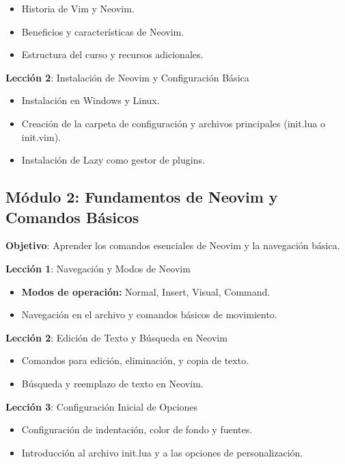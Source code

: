\documentclass[
  a4paper,
  DIV=11,
  numbers=noendperiod,
  onepage,
  openany]{scrreprt}
\begin{document}
\begin{itemize}
\item
  Historia de Vim y Neovim.
\item
  Beneficios y características de Neovim.
\item
  Estructura del curso y recursos adicionales.
\end{itemize}

\textbf{Lección 2}: Instalación de Neovim y Configuración Básica

\begin{itemize}
\item
  Instalación en Windows y Linux.
\item
  Creación de la carpeta de configuración y archivos principales
  (init.lua o init.vim).
\item
  Instalación de Lazy como gestor de plugins.
\end{itemize}

\subsection{\texorpdfstring{\textbf{Módulo 2}: Fundamentos de Neovim y
Comandos
Básicos}{Módulo 2: Fundamentos de Neovim y Comandos Básicos}}\label{muxf3dulo-2-fundamentos-de-neovim-y-comandos-buxe1sicos}

\textbf{Objetivo}: Aprender los comandos esenciales de Neovim y la
navegación básica.

\textbf{Lección 1}: Navegación y Modos de Neovim

\begin{itemize}
\item
  \textbf{Modos de operación:} Normal, Insert, Visual, Command.
\item
  Navegación en el archivo y comandos básicos de movimiento.
\end{itemize}

\textbf{Lección 2}: Edición de Texto y Búsqueda en Neovim

\begin{itemize}
\item
  Comandos para edición, eliminación, y copia de texto.
\item
  Búsqueda y reemplazo de texto en Neovim.
\end{itemize}

\textbf{Lección 3}: Configuración Inicial de Opciones

\begin{itemize}
\item
  Configuración de indentación, color de fondo y fuentes.
\item
  Introducción al archivo init.lua y a las opciones de personalización.
\end{itemize}
\end{document}
